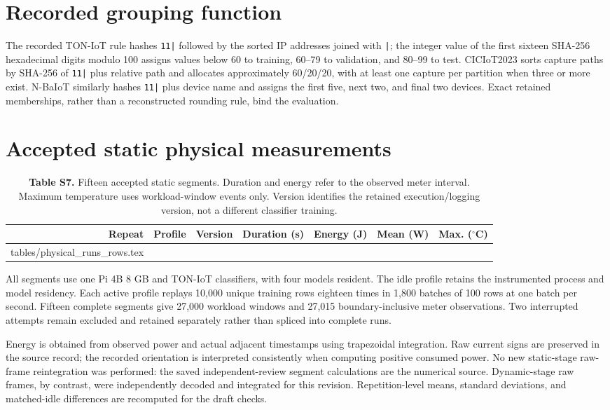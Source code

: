\documentclass[10pt,a4paper]{article}
\makeatletter
\newcommand{\tableinput}[1]{\@@input #1.tex }
\makeatother
\begin{document}
\section{Recorded grouping function}
The recorded TON-IoT rule hashes \texttt{11|} followed by the sorted IP addresses joined with \texttt{|}; the integer value of the first sixteen SHA-256 hexadecimal digits modulo 100 assigns values below 60 to training, 60--79 to validation, and 80--99 to test. CICIoT2023 sorts capture paths by SHA-256 of \texttt{11|} plus relative path and allocates approximately 60/20/20, with at least one capture per partition when three or more exist. N-BaIoT similarly hashes \texttt{11|} plus device name and assigns the first five, next two, and final two devices. Exact retained memberships, rather than a reconstructed rounding rule, bind the evaluation.


\clearpage
\section{Accepted static physical measurements}
\begin{table}[h!]
\centering\small
\caption*{\textbf{Table S7.} Fifteen accepted static segments. Duration and energy refer to the observed meter interval. Maximum temperature uses workload-window events only. Version identifies the retained execution/logging version, not a different classifier training.}
\begin{tabular}{rllrrrr}\toprule
Repeat & Profile & Version & Duration (s) & Energy (J) & Mean (W) & Max. ($^\circ$C)\\\midrule
\tableinput{tables/physical_runs_rows}
\bottomrule\end{tabular}
\end{table}
All segments use one Pi 4B 8 GB and TON-IoT classifiers, with four models resident. The idle profile retains the instrumented process and model residency. Each active profile replays 10,000 unique training rows eighteen times in 1,800 batches of 100 rows at one batch per second. Fifteen complete segments give 27,000 workload windows and 27,015 boundary-inclusive meter observations. Two interrupted attempts remain excluded and retained separately rather than spliced into complete runs.

Energy is obtained from observed power and actual adjacent timestamps using trapezoidal integration. Raw current signs are preserved in the source record; the recorded orientation is interpreted consistently when computing positive consumed power. No new static-stage raw-frame reintegration was performed: the saved independent-review segment calculations are the numerical source. Dynamic-stage raw frames, by contrast, were independently decoded and integrated for this revision. Repetition-level means, standard deviations, and matched-idle differences are recomputed for the draft checks.
\end{document}
